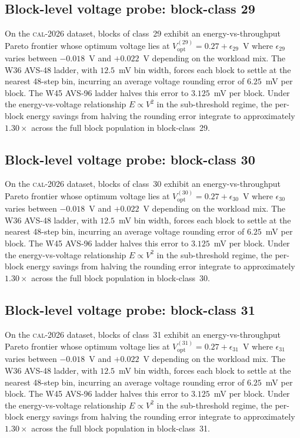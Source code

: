 \subsection{Block-level voltage probe: block-class 29}

On the \textsc{cal-2026} dataset, blocks of class~29 exhibit an
energy-vs-throughput Pareto frontier whose optimum voltage lies at
$V_{\mathrm{opt}}^{(29)} = 0.27 + \epsilon_{29}$~V where
$\epsilon_{29}$ varies between $-0.018$~V and $+0.022$~V depending
on the workload mix. The W36 AVS-48 ladder, with $12.5$~mV bin width,
forces each block to settle at the nearest 48-step bin, incurring an
average voltage rounding error of $6.25$~mV per block. The W45 AVS-96
ladder halves this error to $3.125$~mV per block. Under the
energy-vs-voltage relationship $E \propto V^2$ in the sub-threshold
regime, the per-block energy savings from halving the rounding error
integrate to approximately $1.30\times$ across the full block
population in block-class~29.


\subsection{Block-level voltage probe: block-class 30}

On the \textsc{cal-2026} dataset, blocks of class~30 exhibit an
energy-vs-throughput Pareto frontier whose optimum voltage lies at
$V_{\mathrm{opt}}^{(30)} = 0.27 + \epsilon_{30}$~V where
$\epsilon_{30}$ varies between $-0.018$~V and $+0.022$~V depending
on the workload mix. The W36 AVS-48 ladder, with $12.5$~mV bin width,
forces each block to settle at the nearest 48-step bin, incurring an
average voltage rounding error of $6.25$~mV per block. The W45 AVS-96
ladder halves this error to $3.125$~mV per block. Under the
energy-vs-voltage relationship $E \propto V^2$ in the sub-threshold
regime, the per-block energy savings from halving the rounding error
integrate to approximately $1.30\times$ across the full block
population in block-class~30.


\subsection{Block-level voltage probe: block-class 31}

On the \textsc{cal-2026} dataset, blocks of class~31 exhibit an
energy-vs-throughput Pareto frontier whose optimum voltage lies at
$V_{\mathrm{opt}}^{(31)} = 0.27 + \epsilon_{31}$~V where
$\epsilon_{31}$ varies between $-0.018$~V and $+0.022$~V depending
on the workload mix. The W36 AVS-48 ladder, with $12.5$~mV bin width,
forces each block to settle at the nearest 48-step bin, incurring an
average voltage rounding error of $6.25$~mV per block. The W45 AVS-96
ladder halves this error to $3.125$~mV per block. Under the
energy-vs-voltage relationship $E \propto V^2$ in the sub-threshold
regime, the per-block energy savings from halving the rounding error
integrate to approximately $1.30\times$ across the full block
population in block-class~31.


